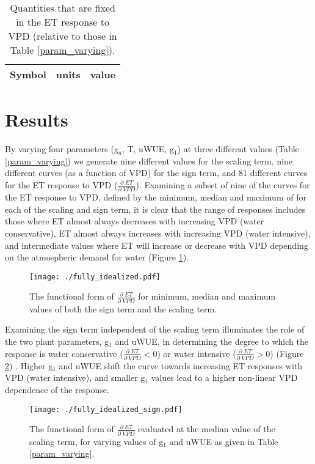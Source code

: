 \begin{table}
  \caption{Quantities that are fixed in the ET response to VPD
    (relative to those in Table \ref{param_varying}).}
  \label{param_fixed}
  \centering
  \begin{tabular}{l c c}
    \hline
    Symbol & units & value \\
    \hline
    
    \hline
  \end{tabular}
\end{table}

\section{Results}
\label{results}

By varying four parameters (g$_a$, T, uWUE, g$_1$) at three different
values (Table \ref{param_varying}) we generate nine different values
for the scaling term, nine different curves (as a function of VPD) for
the sign term, and 81 different curves for the ET response to VPD
($\frac{\partial \; ET}{\partial \; VPD}$). Examining a subset of nine
of the curves for the ET response to VPD, defined by the minimum, median
and maximum of for each of the scaling and sign term, it is clear
that the range of responses includes those where ET almost always
decreases with increasing VPD (water conservative), ET almost always
increases with increasing VPD (water intensive), and intermediate
values where ET will increase or decrease with VPD depending on the
atmospheric demand for water (Figure \ref{full}).

\begin{figure}
  \centering \texttt{[image: ./fully\_idealized.pdf]}
  \caption{The functional form of $\frac{\partial \; ET}{\partial
      \; VPD}$ for minimum, median and maximum values of both the sign
    term and the scaling term.}
  \label{full}
\end{figure}

Examining the sign term independent of the scaling term illuminates
the role of the two plant parameters, g$_1$ and uWUE, in determining
the degree to which the response is water conservative
($\frac{\partial \; ET}{\partial \; VPD} < 0$) or water intensive
($\frac{\partial \; ET}{\partial \; VPD} > 0$) (Figure \ref{sign})
. Higher g$_1$ and uWUE shift the curve towards increasing ET
responses with VPD (water intensive), and smaller g$_1$ values lead to
a higher non-linear VPD dependence of the response.

\begin{figure}
  \centering \texttt{[image: ./fully\_idealized\_sign.pdf]}
  \caption{The functional form of $\frac{\partial \; ET}{\partial
      \; VPD}$ evaluated at the median value of the scaling term, for
    varying values of g$_1$ and uWUE as given in Table \ref{param_varying}.}
  \label{sign}
\end{figure}

